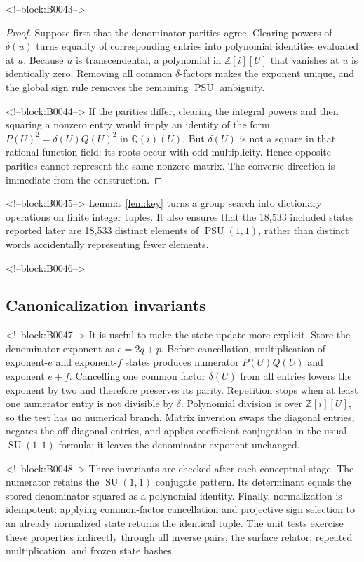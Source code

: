 \documentclass[11pt,a4paper]{article}
\theoremstyle{definition}
\newcommand{\Z}{\mathbb Z}
\newcommand{\Q}{\mathbb Q}
\newcommand{\PSU}{\operatorname{PSU}}
\newcommand{\SU}{\operatorname{SU}}
\begin{document}
<!--block:B0043-->
\begin{proof}
Suppose first that the denominator parities agree.  Clearing powers of
\(\delta(u)\) turns equality of corresponding entries into polynomial
identities evaluated at \(u\).  Because \(u\) is transcendental, a polynomial
in \(\Z[i][U]\) that vanishes at \(u\) is identically zero.  Removing all
common \(\delta\)-factors makes the exponent unique, and the global sign rule
removes the remaining \(\PSU\) ambiguity.

<!--block:B0044-->
If the parities differ, clearing the integral powers and then squaring a
nonzero entry would imply an identity of the form
\(P(U)^2=\delta(U)Q(U)^2\) in \(\Q(i)(U)\).  But \(\delta(U)\) is not a square
in that rational-function field: its roots occur with odd multiplicity.
Hence opposite parities cannot represent the same nonzero matrix.  The
converse direction is immediate from the construction.
\end{proof}

<!--block:B0045-->
Lemma~\ref{lem:key} turns a group search into dictionary operations on finite
integer tuples.  It also ensures that the 18,533 included states reported
later are 18,533 distinct elements of \(\PSU(1,1)\), rather than distinct
words accidentally representing fewer elements.

<!--block:B0046-->
\subsection{Canonicalization invariants}

<!--block:B0047-->
It is useful to make the state update more explicit.  Store the denominator
exponent as \(e=2q+p\).  Before cancellation, multiplication of exponent-\(e\)
and exponent-\(f\) states produces numerator \(P(U)Q(U)\) and exponent
\(e+f\).  Cancelling one common factor \(\delta(U)\) from all entries lowers
the exponent by two and therefore preserves its parity.  Repetition stops
when at least one numerator entry is not divisible by \(\delta\).  Polynomial
division is over \(\Z[i][U]\), so the test has no numerical branch.  Matrix
inversion swaps the diagonal entries, negates the off-diagonal entries, and
applies coefficient conjugation in the usual \(\SU(1,1)\) formula; it leaves
the denominator exponent unchanged.

<!--block:B0048-->
Three invariants are checked after each conceptual stage.  The numerator
retains the \(\SU(1,1)\) conjugate pattern.  Its determinant equals the stored
denominator squared as a polynomial identity.  Finally, normalization is
idempotent: applying common-factor cancellation and projective sign selection
to an already normalized state returns the identical tuple.  The unit tests
exercise these properties indirectly through all inverse pairs, the surface
relator, repeated multiplication, and frozen state hashes.
\end{document}
